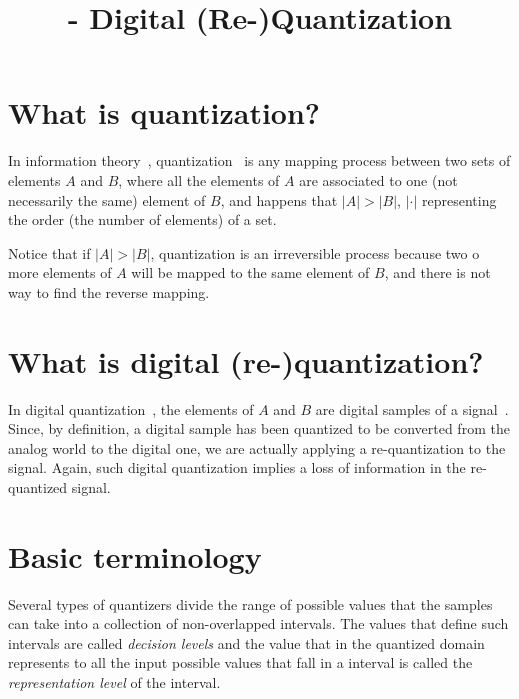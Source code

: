 


\title{\SM{} - Digital (Re-)Quantization}

\maketitle

\tableofcontents

\section{What is quantization?}

In information theory~\cite{vruiz__information_theory},
quantization~\cite{vruiz__signal_quantization,vruiz__scalar_quantization,vruiz__vector_quantization,vruiz__trellis_quantization}
is any mapping process between two sets of elements $A$ and $B$, where
all the elements of $A$ are associated to one (not necessarily the
same) element of $B$, and happens that $|A|>|B|$, $|\cdot|$
representing the order (the number of elements) of a set.

Notice that if $|A|>|B|$, quantization is an irreversible process
because two o more elements of $A$ will be mapped to the same element
of $B$, and there is not way to find the reverse mapping.

\section{What is digital (re-)quantization?}

In digital
quantization~\cite{vruiz__scalar_quantization,vruiz__vector_quantization},
the elements of $A$ and $B$ are digital samples of a
signal~\cite{vruiz__signal_quantization}. Since, by definition, a
digital sample has been quantized to be converted from the analog
world to the digital one, we are actually applying a re-quantization
to the signal. Again, such digital quantization implies a loss of
information in the re-quantized signal.

\section{Basic terminology}

Several types of quantizers divide the range of possible values that
the samples can take into a collection of non-overlapped
intervals. The values that define such intervals are called
\emph{decision levels} and the value that in the quantized domain
represents to all the input possible values that fall in a interval is
called the \emph{representation level} of the interval.

